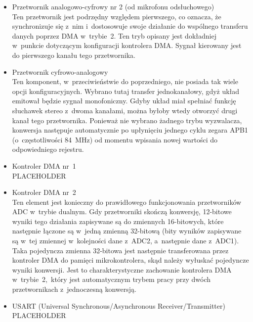 \begin{itemize}
\begin{center}
\end{center}
	W~związku z~tym, przetwornik w~takiej konfiguracji będzie mógł efektywnie konwertować sygnały o~maksymalnej częstotliwości równej \SI{3811}{\Hz}. Należy jednak wziąć pod uwagę czas, jaki zajmą obliczenia generujące sygnał przeciwstawny, częstotliwość wzbudzeń pochodzących od timera oraz czas konwersji DAC. Wszystkie te oraz inne czynniki składają się na zmniejszenie efektywnej zdolności przetwarzania układu. Autor po opisaniu wszystkich parametrów konfiguracyjnych oraz zaimplementowaniu i~przetestowaniu programu przedstawi maksymalną częstotliwość, jaką układ jest w~stanie przetwarzać.
	\item Przetwornik analogowo-cyfrowy nr 2 (od mikrofonu odsłuchowego)\\
	Ten przetwornik jest podrzędny względem pierwszego, co oznacza, że synchronizuje się z~nim i~dostosowuje swoje działanie do wspólnego transferu danych poprzez DMA w~trybie~2. Ten tryb opisany jest dokładniej w~punkcie dotyczącym konfiguracji kontrolera DMA. Sygnał kierowany jest do pierwszego kanału tego przetwornika.
	\item Przetwornik cyfrowo-analogowy\\
	Ten komponent, w~przeciwieństwie do poprzedniego, nie posiada tak wiele opcji konfiguracyjnych. Wybrano tutaj transfer jednokanałowy, gdyż układ emitował będzie sygnał monofoniczny. Gdyby układ miał spełniać funkcję słuchawek stereo z~dwoma kanałami, można byłoby wtedy otworzyć drugi kanał tego przetwornika. Ponieważ nie wybrano żadnego trybu wyzwalacza, konwersja następuje automatycznie po upłynięciu jednego cyklu zegara APB1 (o~częstotliwości \SI{84}{\MHz}) od momentu wpisania nowej wartości do odpowiedniego rejestru.
	\item Kontroler DMA nr~1\\
	PLACEHOLDER
	\item Kontroler DMA nr~2\\
	Ten element jest konieczny do prawidłowego funkcjonowania przetworników ADC w~trybie dualnym. Gdy przetworniki skończą konwersję, 12-bitowe wyniki tego działania zapisywane są do zmiennych 16-bitowych, które następnie łączone są w~jedną zmienną 32-bitową (bity wyników zapisywane są w~tej zmiennej w~kolejności dane z~ADC2, a~następnie dane z~ADC1). Taka pojedyncza zmienna 32-bitowa jest następnie transferowana przez kontroler DMA do pamięci mikrokontrolera, skąd należy wyłuskać pojedyncze wyniki konwersji. Jest to charakterystyczne zachowanie kontrolera DMA w~trybie~2,~który jest automatycznym trybem pracy przy dwóch przetwornikach z~jednoczesną konwersją.
	\item USART (Universal Synchronous/Asynchronous Receiver/Transmitter)\\
	PLACEHOLDER
\end{itemize}
